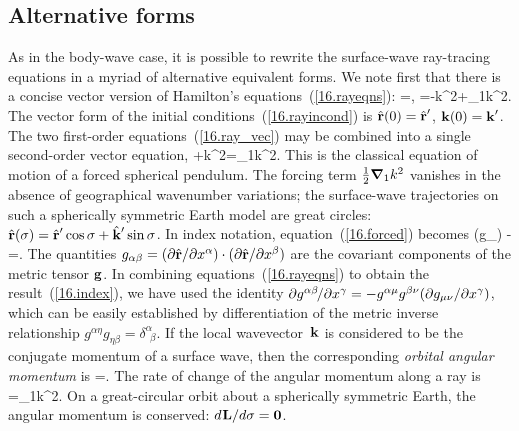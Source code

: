 \renewcommand{\thesubsection}{$\!\!\!\raise1.3ex\hbox{$\star$}\!\!$
\arabic{chapter}.\arabic{section}.\arabic{subsection}}
\subsection{Alternative forms}
\renewcommand{\thesubsection}{\arabic{chapter}.\arabic{section}.\arabic{subsection}}

As in the body-wave case, it is possible to rewrite the
surface-wave ray-tracing equations in a myriad
of alternative equivalent forms.  We note first that
there is a concise vector version of Hamilton's
equations~(\ref{16.rayeqns}):
\eq \label{16.ray_vec}
=\bk,
\qquad
{}=-k^2\brh+\half\bdel_1k^2.
\en
The vector form of the initial
conditions~(\ref{16.rayincond}) is $\mbox{$\hat{\mbox{${\bf r}$}}$}(0)=\mbox{$\hat{\mbox{${\bf r}$}}$}'$, $\mbox{${\bf k}$}(0)=\mbox{${\bf k}$}'$.
The two first-order equations~(\ref{16.ray_vec}) may be combined
into a single second-order vector equation,
\eq \label{16.forced}
+k^2\brh=\half\bdel_1k^2.
\en
This is the classical equation of motion of a forced
spherical pendulum.  The forcing term $\mbox{$\frac{1}{2}$}\mbox{\boldmath $\nabla$}_1k^2$
vanishes in the absence of geographical wavenumber variations;
the surface-wave trajectories on such a spherically
symmetric Earth model are great circles: $\brh(\sigma)=\brh'\cos\sigma+
\bkh^{\raisebox{-0.5 ex}{$\scriptstyle\prime$}}\sin\sigma$.
In index notation, equation~(\ref{16.forced}) becomes
\eq \label{16.index}
\left(g_{\gamma\eta}\right)
-\half{}
=\half{}.
\en
The quantities
$g_{\alpha\beta}=(\mbox{$\partial$}\mbox{$\hat{\mbox{${\bf r}$}}$}/\mbox{$\partial$} x^\alpha)\cdot(\mbox{$\partial$}\mbox{$\hat{\mbox{${\bf r}$}}$}/\mbox{$\partial$} x^\beta)$
are the covariant components of the metric tensor $\mbox{${\bf g}$}$.  In
combining equations~(\ref{16.rayeqns}) to obtain the result~(\ref{16.index}),
we have used the identity $\mbox{$\partial$} g^{\alpha\beta}\hspace{-0.5 mm}/\mbox{$\partial$} x^\gamma
=-g^{\alpha\mu}g^{\beta\nu}(\mbox{$\partial$} g_{\mu\nu}/\mbox{$\partial$} x^\gamma)$,
which can be easily established by differentiation of the
metric inverse relationship
$g^{\alpha\eta}g_{\eta\beta}=\delta^{\alpha}_{\;\,\beta}$.
If the local wavevector~$\mbox{${\bf k}$}$ is
considered to be the conjugate momentum of a surface
wave, then the corresponding {\em orbital angular momentum\/} is
%
%
\eq
\bL=\brh\times\bk.
\en
The rate of change of the angular momentum along a ray is
\eq
{}=\half\brh\times\bdel_1k^2.
\en
On a great-circular orbit about a spherically symmetric Earth,
the angular momentum is conserved: $d\hspace{0.2 mm}\mbox{${\bf L}$}/d\sigma=\mbox{${\bf 0}$}$.

